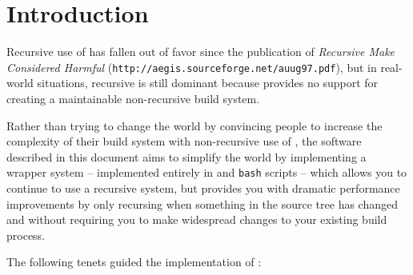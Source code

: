%
%
%
%
\chapter{Introduction}

Recursive use of \make has fallen out of favor since the publication
of \emph{Recursive Make Considered Harmful}
(\texttt{http://aegis.sourceforge.net/auug97.pdf}), but in real-world
situations, recursive \make is still dominant because \make provides
no support for creating a maintainable non-recursive build system.

Rather than trying to change the world by convincing people to
increase the complexity of their build system with non-recursive use
of \make, the software described in this document aims to simplify the
world by implementing a wrapper system -- implemented entirely in
\gnumake and \texttt{bash} scripts -- which allows you to continue to
use a recursive \make system, but provides you with dramatic
performance improvements by only recursing when something in the
source tree has changed and without requiring you to make widespread
changes to your existing build process.

The following tenets guided the implementation of \lmsbw:

